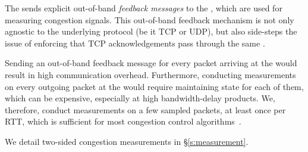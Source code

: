The \outbox sends explicit out-of-band \emph{feedback messages} to the \inbox, which are used for measuring congestion signals. 
This out-of-band feedback mechanism is not only agnostic to the underlying protocol (be it TCP or UDP), but also side-steps the issue of enforcing that TCP acknowledgements pass through the same \inbox.

 Sending an out-of-band feedback message for every packet arriving at the \outbox would result in high communication overhead. Furthermore, conducting measurements on every outgoing packet at the \inbox would require maintaining state for each of them, which can be expensive, especially at high bandwidth-delay products. We, therefore, conduct measurements on a few sampled packets, at least once per RTT, which is sufficient for most congestion control algorithms~\cite{ccp}. 

We detail two-sided congestion measurements in \S\ref{s:measurement}.
